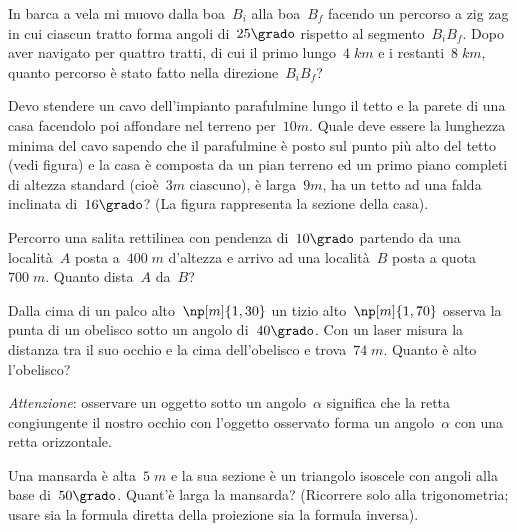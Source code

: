 \begin{esercizio}[\Ast]
\label{ese:G.46}
In barca a vela mi muovo dalla boa~$B_i$ alla boa~$B_f$ facendo un percorso a zig zag in cui ciascun tratto forma angoli di~$25\grado$
rispetto al segmento~$B_i B_f$. Dopo aver navigato per quattro tratti, di cui il primo lungo~$4\;\unit{km}$ e i restanti~$8\;\unit{km}$,
quanto percorso è stato fatto nella direzione~$B_i B_f$?
\begin{center}
 
\end{center}
\end{esercizio}
\begin{multicols}{2}
\begin{esercizio}[\Ast]
\label{ese:G.47}
Devo stendere un cavo dell'impianto parafulmine lungo il tetto e la parete di una casa facendolo poi affondare nel terreno per~$10\unit{m}$.
Quale deve essere la lunghezza minima del cavo sapendo che il parafulmine è posto sul punto più alto del tetto (vedi figura) e la casa è
composta da un pian terreno ed un primo piano completi di altezza standard (cioè~$3\unit{m}$ ciascuno), è larga~$9\unit{m}$,
ha un tetto ad una falda inclinata di~$16\grado$? (La figura rappresenta la sezione della casa).
\begin{center}
 
\end{center}
\end{esercizio}


 \begin{esercizio}[\Ast]
\label{ese:G.48}
Percorro una salita rettilinea con pendenza di~$10\grado$ partendo da una località~$A$ posta a~$400\;\unit{m}$ d'altezza e arrivo ad
una località~$B$ posta a quota~$700\;\unit{m}$. Quanto dista~$A$ da~$B$?
\end{esercizio}

\begin{esercizio}[\Ast]
\label{ese:G.49}
Dalla cima di un palco alto~$\np[m]{1,30}$ un tizio alto~$\np[m]{1,70}$ osserva la punta di un obelisco sotto un angolo di~$40\grado$.
Con un laser misura la distanza tra il suo occhio e la cima dell'obelisco e trova~$74\;\unit{m}$. Quanto è alto l'obelisco?

\emph{Attenzione}: osservare un oggetto sotto un angolo~$\alpha$ significa che la retta congiungente il nostro occhio con l'oggetto osservato
forma un angolo~$\alpha$ con una retta orizzontale.
\end{esercizio}

\begin{esercizio}[\Ast]
\label{ese:G.50}
Una mansarda è alta~$5\;\unit{m}$ e la sua sezione è un triangolo isoscele con angoli alla base di~$50\grado$. Quant'è larga la mansarda?
(Ricorrere solo alla trigonometria; usare sia la formula diretta della proiezione sia la formula inversa).
\end{esercizio}
\end{multicols}


